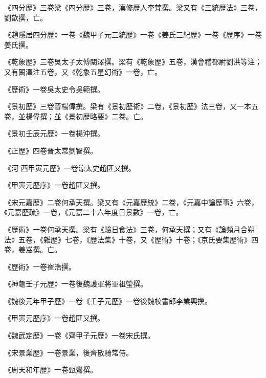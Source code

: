 \begin{pinyinscope}
 《四分歷》三卷梁《四分歷》三卷，漢修歷人李梵撰。梁又有《三統歷法》三卷，劉歆撰，亡。



 《趙隱居四分歷》一卷《魏甲子元三統歷》一卷《姜氏三紀歷》一卷《歷序》一卷姜氏撰。



 《乾象歷》三卷吳太子太傅闞澤撰。梁有《乾象歷》五卷，漢會稽都尉劉洪等注；又有闞澤注五卷，又《乾象五星幻術》一卷，亡。



 《歷術》一卷吳太史令吳範撰。



 《景初歷》三卷晉楊偉撰。梁有《景初歷術》二卷，《景初歷》法三卷，又一本五卷，並楊偉撰；並《景初歷略要》二卷。亡。



 《景初壬辰元歷》一卷楊沖撰。



 《正歷》四卷晉太常劉智撰。



 《河
 西甲寅元歷》一卷涼太史趙匪又撰。



 《甲寅元歷序》一卷趙匪又撰。



 《宋元嘉歷》二卷何承天撰。梁又有《元嘉歷統》二卷，《元嘉中論歷事》六卷，《元嘉歷疏》一卷，《元嘉二十六年度日景數》一卷，亡。



 《歷術》一卷何承天撰。梁有《驗日食法》三卷，何承天撰；又有《論頻月合朔法》五卷，《雜歷》七卷，《歷法集》十卷，又《歷術》十卷；《京氏要集歷術》四卷，姜岌撰。亡。



 《歷術》一卷崔浩撰。



 《神龜壬子元歷》一卷後魏護軍將軍祖瑩撰。



 《魏後元年甲子歷》一卷《壬子元歷》一卷後魏校書郎李業興撰。



 《甲寅元歷序》一卷趙匪又撰。



 《魏武定歷》一卷《齊甲子元歷》一卷宋氏撰。



 《宋景業歷》一卷景業，後齊散騎常侍。



 《周天和年歷》一卷甄鸞撰。




\end{pinyinscope}
